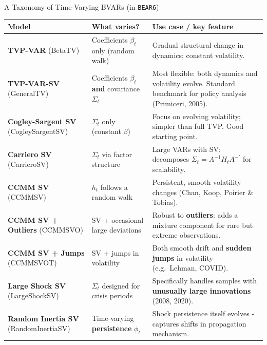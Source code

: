 \documentclass{beamer}
\begin{document}
\begin{frame}{A Taxonomy of Time-Varying BVARs (in \texttt{BEAR6})}
\scriptsize

\renewcommand{\arraystretch}{1.35}
\begin{tabular}{p{2.6cm} p{3.2cm} p{4.8cm}}
\toprule
\textbf{Model} & \textbf{What varies?} & \textbf{Use case / key feature} \\
\midrule
\textbf{TVP-VAR} \newline(BetaTV) &
  Coefficients $\beta_t$ only \newline(random walk) &
  Gradual structural change in dynamics; constant volatility. \\

\textbf{TVP-VAR-SV} \newline(GeneralTV) &
  Coefficients $\beta_t$ \textbf{and} covariance $\Sigma_t$ &
  Most flexible: both dynamics and volatility evolve. Standard benchmark for policy analysis (Primiceri, 2005). \\

\textbf{Cogley-Sargent SV} \newline(CogleySargentSV) &
  $\Sigma_t$ only (constant $\beta$) &
  Focus on evolving volatility; simpler than full TVP. Good starting point. \\

\textbf{Carriero SV} \newline(CarrieroSV) &
  $\Sigma_t$ via factor structure &
  Large VARs with SV: decomposes $\Sigma_t = A^{-1} H_t A^{-\prime}$ for scalability. \\

\textbf{CCMM SV} \newline(CCMMSV) &
  $h_t$ follows a random walk &
  Persistent, smooth volatility changes (Chan, Koop, Poirier \& Tobias). \\

\textbf{CCMM SV + Outliers} \newline(CCMMSVO) &
  SV + occasional large deviations &
  Robust to \textbf{outliers}: adds a mixture component for rare but extreme observations. \\

\textbf{CCMM SV + Jumps} \newline(CCMMSVOT) &
  SV + jumps in volatility &
  Both smooth drift and \textbf{sudden jumps} in volatility (e.g.\ Lehman, COVID). \\

\textbf{Large Shock SV} \newline(LargeShockSV) &
  $\Sigma_t$ designed for crisis periods &
  Specifically handles samples with \textbf{unusually large innovations} (2008, 2020). \\

\textbf{Random Inertia SV} \newline(RandomInertiaSV) &
  Time-varying \textbf{persistence} $\phi_t$ &
  Shock persistence itself evolves - captures shifts in propagation mechanism. \\
\bottomrule
\end{tabular}

\end{frame}
\end{document}

